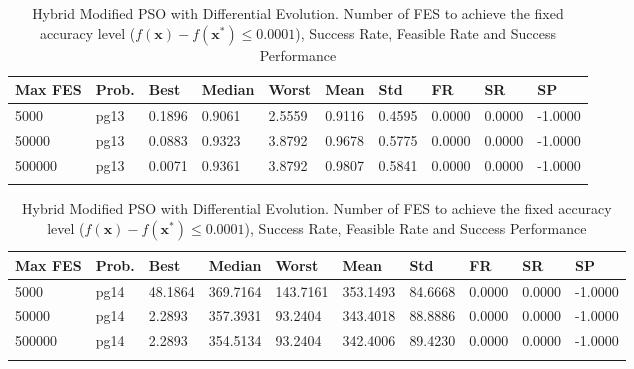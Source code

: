 \documentclass[10pt, a4paper]{book}
\begin{document}
\begin{center}
\begin{longtable}{l l l l l l l l l l}
\textbf{Max FES} & \textbf{Prob.} & \textbf{Best} & \textbf{Median} & \textbf{Worst} & \textbf{Mean} & \textbf{Std} & \textbf{FR} & \textbf{SR} & \textbf{SP} \\
\hline
5000 & pg13 & 0.1896 & 0.9061 & 2.5559 & 0.9116 & 0.4595 & 0.0000 & 0.0000 & -1.0000 \\
50000 & pg13 & 0.0883 & 0.9323 & 3.8792 & 0.9678 & 0.5775 & 0.0000 & 0.0000 & -1.0000 \\
500000 & pg13 & 0.0071 & 0.9361 & 3.8792 & 0.9807 & 0.5841 & 0.0000 & 0.0000 & -1.0000 \\

\caption{ Hybrid Modified PSO with Differential Evolution. Number of FES to achieve the fixed accuracy level ($f(\mathbf{x}) - f(\mathbf{x}^{*}) \leq 0.0001$), Success Rate, Feasible Rate and Success Performance }
\end{longtable}
\end{center}

\begin{center}
\begin{longtable}{l l l l l l l l l l}
\textbf{Max FES} & \textbf{Prob.} & \textbf{Best} & \textbf{Median} & \textbf{Worst} & \textbf{Mean} & \textbf{Std} & \textbf{FR} & \textbf{SR} & \textbf{SP} \\
\hline
5000 & pg14 & 48.1864 & 369.7164 & 143.7161 & 353.1493 & 84.6668 & 0.0000 & 0.0000 & -1.0000 \\
50000 & pg14 & 2.2893 & 357.3931 & 93.2404 & 343.4018 & 88.8886 & 0.0000 & 0.0000 & -1.0000 \\
500000 & pg14 & 2.2893 & 354.5134 & 93.2404 & 342.4006 & 89.4230 & 0.0000 & 0.0000 & -1.0000 \\

\caption{ Hybrid Modified PSO with Differential Evolution. Number of FES to achieve the fixed accuracy level ($f(\mathbf{x}) - f(\mathbf{x}^{*}) \leq 0.0001$), Success Rate, Feasible Rate and Success Performance }
\end{longtable}
\end{center}
\end{document}
